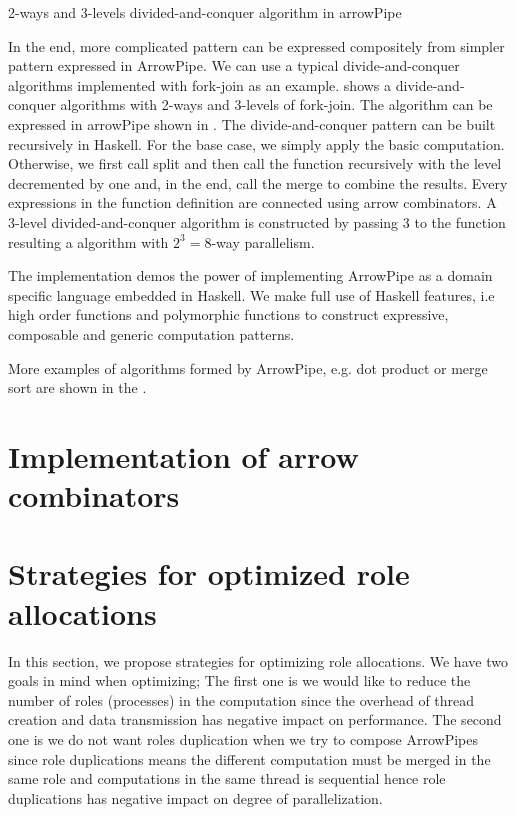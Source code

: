 \begin{listing}[ht]
    \inputminted{Haskell}{arrow/dq.hs}
    \caption{2-ways and 3-levels divided-and-conquer algorithm in arrowPipe}
    \label{arrowPipe:dq}
\end{listing}
In the end, more complicated pattern can be expressed compositely from simpler pattern expressed in ArrowPipe. We can use a typical divide-and-conquer algorithms implemented with fork-join as an example.  shows a divide-and-conquer algorithms with 2-ways and 3-levels of fork-join. The algorithm can be expressed in arrowPipe shown in . The divide-and-conquer pattern can be built recursively in Haskell. For the base case, we simply apply the basic computation. Otherwise, we first call split and then call the function recursively with the level decremented by one and, in the end, call the merge to combine the results. Every expressions in the function definition are connected using arrow combinators. A 3-level divided-and-conquer algorithm is constructed by passing 3 to the function resulting a algorithm with $2^3 = 8$-way parallelism.

The implementation demos the power of implementing ArrowPipe as a domain specific language embedded in Haskell. We make full use of Haskell features, i.e high order functions and polymorphic functions to construct expressive, composable and generic computation patterns.

More examples of algorithms formed by ArrowPipe, e.g. dot product or merge sort are shown in the .
\section{Implementation of arrow combinators} \label{arrowPipe:impl}
\section{Strategies for optimized role allocations} \label{arrowPipe:roleAllc}
In this section, we propose strategies for optimizing role allocations. We have two goals in mind when optimizing; The first one is we would like to reduce the number of roles (processes) in the computation since the overhead of thread creation and data transmission has negative impact on performance. The second one is we do not want roles duplication when we try to compose ArrowPipes since role duplications means the different computation must be merged in the same role and computations in the same thread is sequential hence role duplications has negative impact on degree of parallelization. 

